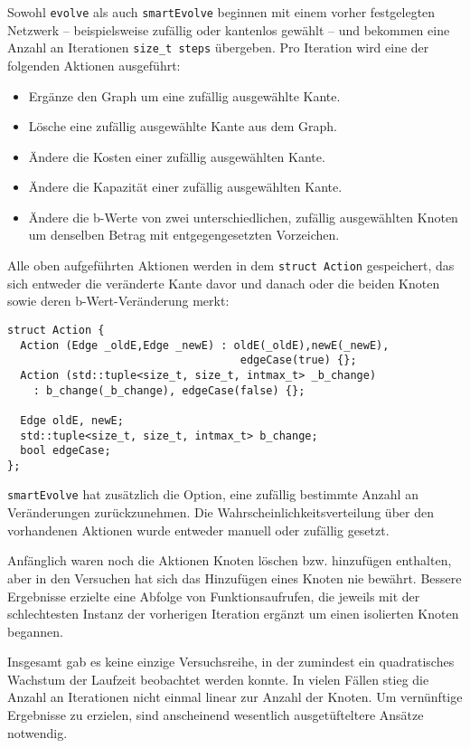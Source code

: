 Sowohl \lstinline|evolve| als auch \lstinline|smartEvolve| beginnen mit einem vorher festgelegten Netzwerk -- beispielsweise zufällig oder kantenlos gewählt -- und bekommen eine Anzahl an Iterationen \lstinline|size_t steps| übergeben. Pro Iteration wird eine der folgenden Aktionen ausgeführt:
\begin{itemize}\itemsep0em
    \item Ergänze den Graph um eine zufällig ausgewählte Kante.
    \item Lösche eine zufällig ausgewählte Kante aus dem Graph.
    \item Ändere die Kosten einer zufällig ausgewählten Kante.
    \item Ändere die Kapazität einer zufällig ausgewählten Kante.
    \item Ändere die b-Werte von zwei unterschiedlichen, zufällig ausgewählten Knoten um denselben Betrag mit entgegengesetzten Vorzeichen.
\end{itemize}

Alle oben aufgeführten Aktionen werden in dem \lstinline|struct Action| gespeichert, das sich entweder die veränderte Kante davor und danach oder die beiden Knoten sowie deren b-Wert-Veränderung merkt:

\begin{lstlisting}
struct Action {
  Action (Edge _oldE,Edge _newE) : oldE(_oldE),newE(_newE),
                                    edgeCase(true) {};
  Action (std::tuple<size_t, size_t, intmax_t> _b_change)
    : b_change(_b_change), edgeCase(false) {};

  Edge oldE, newE;
  std::tuple<size_t, size_t, intmax_t> b_change;
  bool edgeCase;
};
\end{lstlisting}

\lstinline|smartEvolve| hat zusätzlich die Option, eine zufällig bestimmte Anzahl an Veränderungen zurückzunehmen. Die Wahrscheinlichkeitsverteilung über den vorhandenen Aktionen wurde entweder manuell oder zufällig gesetzt. 

Anfänglich waren noch die Aktionen Knoten löschen bzw. hinzufügen enthalten, aber in den Versuchen hat sich das Hinzufügen eines Knoten nie bewährt. Bessere Ergebnisse erzielte eine Abfolge von Funktionsaufrufen, die jeweils mit der schlechtesten Instanz der vorherigen Iteration ergänzt um einen isolierten Knoten begannen.

Insgesamt gab es keine einzige Versuchsreihe, in der zumindest ein quadratisches Wachstum der Laufzeit beobachtet werden konnte. In vielen Fällen stieg die Anzahl an Iterationen nicht einmal linear zur Anzahl der Knoten. Um vernünftige Ergebnisse zu erzielen, sind anscheinend wesentlich ausgetüfteltere Ansätze notwendig.